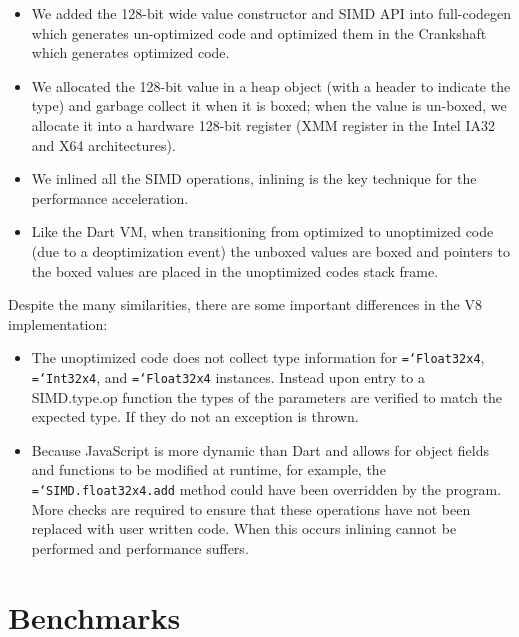 \documentclass[preprint]{sigplanconf}
\newcommand{\ttt}[1]{{\texttt{\hyphenchar\font=`\-\relax #1}}}%
\begin{document}
\begin{itemize}
\item
We added the 128-bit wide value constructor and SIMD API into full-codegen which
generates un-optimized code and optimized them in the Crankshaft which generates
optimized code.

\item
We allocated the 128-bit value in a heap object (with a header to indicate the
type) and garbage collect it when it is boxed; when the value is un-boxed, we
allocate it into a hardware 128-bit register (XMM register in the Intel IA32 and
X64 architectures).

\item
We inlined all the SIMD operations, inlining is the key technique for the
performance acceleration.

\item
Like the Dart VM, when transitioning from optimized to unoptimized code (due to
a deoptimization event) the unboxed values are boxed and pointers to the boxed
values are placed in the unoptimized codes stack frame.

\end{itemize}

Despite the many similarities, there are some important differences in the V8
implementation:

\begin{itemize}
\item
The unoptimized code does not collect type information for \ttt{Float32x4},
\ttt{Int32x4}, and \ttt{Float32x4} instances. Instead upon entry to a
SIMD.type.op function the types of the parameters are verified to match the
expected type. If they do not an exception is thrown.

\item
Because JavaScript is more dynamic than Dart and allows for object fields and
functions to be modified at runtime, for example, the \ttt{SIMD.float32x4.add}
method could have been overridden by the program. More checks are required to
ensure that these operations have not been replaced with user written code. When
this occurs inlining cannot be performed and performance suffers.

\end{itemize}

\section{Benchmarks}
\label{sec:benchmarks}
\end{document}
